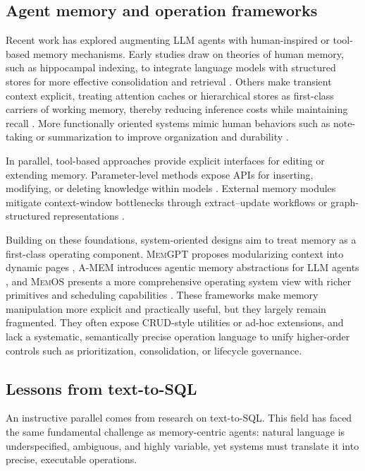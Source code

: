 \documentclass[conference]{IEEEtran}
\begin{document}
\subsection{Agent memory and operation frameworks}

Recent work has explored augmenting LLM agents with human-inspired or tool-based memory mechanisms. Early studies draw on theories of human memory, such as hippocampal indexing, to integrate language models with structured stores for more effective consolidation and retrieval \cite{Gutierrez2024HippoRAG,Gutierrez2025FromRAGtoMemory}. Others make transient context explicit, treating attention caches or hierarchical stores as first-class carriers of working memory, thereby reducing inference costs while maintaining recall \cite{Yang2024Memory3}. More functionally oriented systems mimic human behaviors such as note-taking or summarization to improve organization and durability \cite{Liang2024PGRAG,Wei2025SecondMe,Wu2023AutoGen}.  

In parallel, tool-based approaches provide explicit interfaces for editing or extending memory. Parameter-level methods expose APIs for inserting, modifying, or deleting knowledge within models \cite{Zhang2024EasyEdit,Xu2025EasyEdit2}. External memory modules mitigate context-window bottlenecks through extract–update workflows or graph-structured representations \cite{Chhikara2025Mem0,Zhong2024MemoryBank,Rasmussen2025Zep}.  

Building on these foundations, system-oriented designs aim to treat memory as a first-class operating component. \textsc{MemGPT} proposes modularizing context into dynamic pages \cite{Packer2024MemGPT}, \textsc{A-MEM} introduces agentic memory abstractions for LLM agents \cite{Xu2025AMEM}, and \textsc{MemOS} presents a more comprehensive operating system view with richer primitives and scheduling capabilities \cite{li2025memos}. These frameworks make memory manipulation more explicit and practically useful, but they largely remain fragmented. They often expose CRUD-style utilities or ad-hoc extensions, and lack a systematic, semantically precise operation language to unify higher-order controls such as prioritization, consolidation, or lifecycle governance.  

\subsection{Lessons from text-to-SQL}

An instructive parallel comes from research on text-to-SQL. This field has faced the same fundamental challenge as memory-centric agents: natural language is underspecified, ambiguous, and highly variable, yet systems must translate it into precise, executable operations.  
\end{document}
